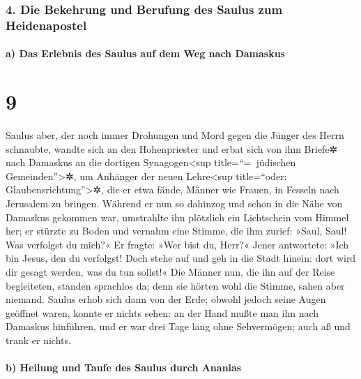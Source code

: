 \hypertarget{die-bekehrung-und-berufung-des-saulus-zum-heidenapostel}{%
\subsubsection{4. Die Bekehrung und Berufung des Saulus zum
Heidenapostel}\label{die-bekehrung-und-berufung-des-saulus-zum-heidenapostel}}

\hypertarget{a-das-erlebnis-des-saulus-auf-dem-weg-nach-damaskus}{%
\paragraph{a) Das Erlebnis des Saulus auf dem Weg nach
Damaskus}\label{a-das-erlebnis-des-saulus-auf-dem-weg-nach-damaskus}}

\hypertarget{section-8}{%
\section{9}\label{section-8}}

 Saulus aber, der noch immer Drohungen und Mord gegen die
Jünger des Herrn schnaubte, wandte sich an den Hohenpriester
 und erbat sich von ihm Briefe✲ nach Damaskus an die
dortigen Synagogen\textless sup title=``=~jüdischen
Gemeinden''\textgreater✲, um Anhänger der neuen Lehre\textless sup
title=``oder: Glaubensrichtung''\textgreater✲, die er etwa fände, Männer
wie Frauen, in Fesseln nach Jerusalem zu bringen.  Während
er nun so dahinzog und schon in die Nähe von Damaskus gekommen war,
umstrahlte ihn plötzlich ein Lichtschein vom Himmel her; 
er stürzte zu Boden und vernahm eine Stimme, die ihm zurief: »Saul,
Saul! Was verfolgst du mich?«  Er fragte: »Wer bist du,
Herr?« Jener antwortete: »Ich bin Jesus, den du verfolgst!
 Doch stehe auf und geh in die Stadt hinein: dort wird dir
gesagt werden, was du tun sollst!«  Die Männer nun, die
ihn auf der Reise begleiteten, standen sprachlos da; denn sie hörten
wohl die Stimme, sahen aber niemand.  Saulus erhob sich
dann von der Erde; obwohl jedoch seine Augen geöffnet waren, konnte er
nichts sehen: an der Hand mußte man ihn nach Damaskus hinführen,
 und er war drei Tage lang ohne Sehvermögen; auch aß und
trank er nichts.

\hypertarget{b-heilung-und-taufe-des-saulus-durch-ananias}{%
\paragraph{b) Heilung und Taufe des Saulus durch
Ananias}\label{b-heilung-und-taufe-des-saulus-durch-ananias}}

